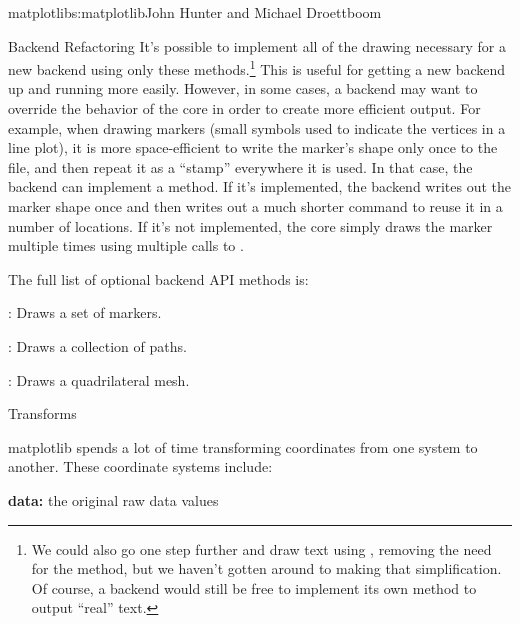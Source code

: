 \begin{aosachapter}{matplotlib}{s:matplotlib}{John Hunter and Michael Droettboom}
\begin{aosasect1}{Backend Refactoring}
It's possible to implement all of the drawing necessary for a new
backend using only these methods.\footnote{We could also go one step
  further and draw text using , removing the
  need for the  method, but we haven't gotten
  around to making that simplification.  Of course, a backend would
  still be free to implement its own  method to
  output ``real'' text.}  This is useful for getting a new backend
up and running more easily.  However, in some cases, a backend may
want to override the behavior of the core in order to create more
efficient output.  For example, when drawing markers (small symbols
used to indicate the vertices in a line plot), it is more
space-efficient to write the marker's shape only once to the file, and
then repeat it as a ``stamp'' everywhere it is used.  In that case,
the backend can implement a  method.  If it's
implemented, the backend writes out the marker shape once and then
writes out a much shorter command to reuse it in a number of
locations.  If it's not implemented, the core simply draws the marker
multiple times using multiple calls to .

The full list of optional backend API methods is:

\begin{aosaitemize}

  \item {}: Draws a set of markers.

  \item {}: Draws a collection of paths.

  \item {}: Draws a quadrilateral mesh.

\end{aosaitemize}

\end{aosasect1}

\begin{aosasect1}{Transforms}


matplotlib spends a lot of time transforming coordinates from one
system to another.  These coordinate systems include:

\begin{aosaitemize}
\item \textbf{data:} the original raw data values


\end{aosaitemize}
\end{aosasect1}
\end{aosachapter}
